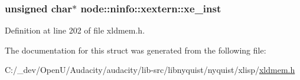 \subsubsection[{\texorpdfstring{xe\+\_\+inst}{xe_inst}}]{\setlength{\rightskip}{0pt plus 5cm}unsigned char$\ast$ node\+::ninfo\+::xextern\+::xe\+\_\+inst}\hypertarget{structnode_1_1ninfo_1_1xextern_aaa686420e5a741eb456054548213a7ea}{}\label{structnode_1_1ninfo_1_1xextern_aaa686420e5a741eb456054548213a7ea}


Definition at line 202 of file xldmem.\+h.



The documentation for this struct was generated from the following file\+:\begin{DoxyCompactItemize}
\item 
C\+:/\+\_\+dev/\+Open\+U/\+Audacity/audacity/lib-\/src/libnyquist/nyquist/xlisp/\hyperlink{xldmem_8h}{xldmem.\+h}\end{DoxyCompactItemize}
